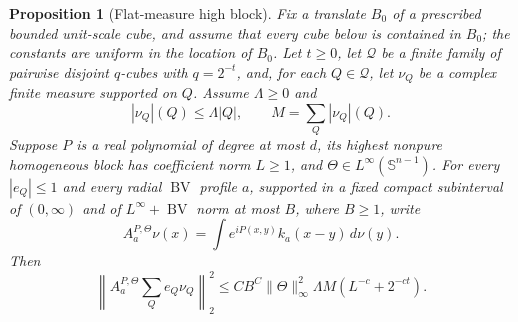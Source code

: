 \documentclass[11pt]{article}
\numberwithin{equation}{section}
\newtheorem{proposition}[theorem]{Proposition}
\theoremstyle{remark}
\theoremstyle{definition}
\newcommand{\Sph}{\mathbb S}
\newcommand{\norm}[1]{\lVert #1\rVert}
\newcommand{\BV}{\operatorname{BV}}
\begin{document}
\begin{proposition}[Flat-measure high block]
\label{prop:flat-high-block}
Fix a translate $B_0$ of a prescribed bounded unit-scale cube, and assume
that every cube below is contained in $B_0$; the constants are uniform in
the location of $B_0$.
Let $t\ge0$, let $\mathcal Q$ be a finite family of pairwise disjoint
$q$-cubes with $q=2^{-t}$, and, for each $Q\in\mathcal Q$, let $\nu_Q$ be
a complex finite measure supported on $Q$.  Assume $\Lambda\ge0$ and
\begin{equation}\label{eq:flat-measure-data}
 |\nu_Q|(Q)\le\Lambda|Q|,\qquad M=\sum_Q|\nu_Q|(Q).
\end{equation}
Suppose $P$ is a real polynomial of degree at most $d$, its highest
nonpure homogeneous block has coefficient norm $L\ge1$, and
$\Theta\in L^\infty(\Sph^{n-1})$.  For every $|e_Q|\le1$ and every radial
$\BV$ profile $a$, supported in a fixed compact subinterval of
$(0,\infty)$ and of $L^\infty+\BV$ norm at most $B$, where $B\ge1$, write
\[
 A^{P,\Theta}_a\nu(x)=\int e^{iP(x,y)}k_a(x-y)\,d\nu(y).
\]
Then
\begin{equation}\label{eq:flat-high-block}
 \left\|A^{P,\Theta}_a\sum_Qe_Q\nu_Q\right\|_2^2
 \le CB^C\norm\Theta_\infty^2\Lambda M
       (L^{-c}+2^{-ct}).
\end{equation}
\end{proposition}
\end{document}
